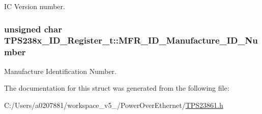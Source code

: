 I\-C Version number. 

\hypertarget{struct_t_p_s238x___i_d___register__t_a2692e9107a90c7b9ffc0d4be7b68feb6}{
\subsubsection[{M\-F\-R\-\_\-\-I\-D\-\_\-\-Manufacture\-\_\-\-I\-D\-\_\-\-Number}]{\setlength{\rightskip}{0pt plus 5cm}unsigned char T\-P\-S238x\-\_\-\-I\-D\-\_\-\-Register\-\_\-t\-::\-M\-F\-R\-\_\-\-I\-D\-\_\-\-Manufacture\-\_\-\-I\-D\-\_\-\-Number}}\label{struct_t_p_s238x___i_d___register__t_a2692e9107a90c7b9ffc0d4be7b68feb6}


Manufacture Identification Number. 



The documentation for this struct was generated from the following file\-:\begin{DoxyCompactItemize}
\item 
C\-:/\-Users/a0207881/workspace\-\_\-v5\-\_/\-Power\-Over\-Ethernet/\hyperlink{_t_p_s23861_8h}{T\-P\-S23861.\-h}\end{DoxyCompactItemize}
